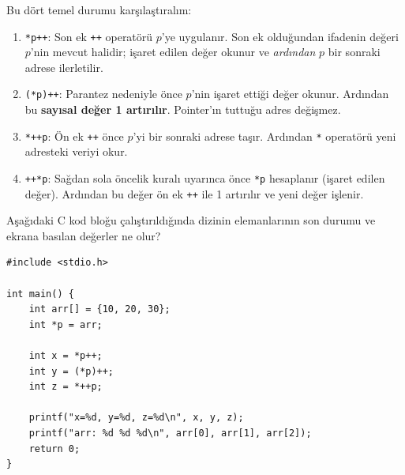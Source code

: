 Bu dört temel durumu karşılaştıralım:
\begin{enumerate}
    \item \texttt{*p++}: Son ek \texttt{++} operatörü $p$'ye uygulanır. Son ek olduğundan ifadenin değeri $p$'nin mevcut halidir; işaret edilen değer okunur ve \emph{ardından} $p$ bir sonraki adrese ilerletilir.
    \item \texttt{(*p)++}: Parantez nedeniyle önce $p$'nin işaret ettiği değer okunur. Ardından bu \textbf{sayısal değer 1 artırılır}. Pointer'ın tuttuğu adres değişmez.
    \item \texttt{*++p}: Ön ek \texttt{++} önce $p$'yi bir sonraki adrese taşır. Ardından \texttt{*} operatörü yeni adresteki veriyi okur.
    \item \texttt{++*p}: Sağdan sola öncelik kuralı uyarınca önce \texttt{*p} hesaplanır (işaret edilen değer). Ardından bu değer ön ek \texttt{++} ile 1 artırılır ve yeni değer işlenir.
\end{enumerate}

\begin{example}
Aşağıdaki C kod bloğu çalıştırıldığında dizinin elemanlarının son durumu ve ekrana basılan değerler ne olur?
\begin{lstlisting}[language=CTemel]
#include <stdio.h>

int main() {
    int arr[] = {10, 20, 30};
    int *p = arr;

    int x = *p++;
    int y = (*p)++;
    int z = *++p;

    printf("x=%d, y=%d, z=%d\n", x, y, z);
    printf("arr: %d %d %d\n", arr[0], arr[1], arr[2]);
    return 0;
}
\end{lstlisting}
\end{example}


